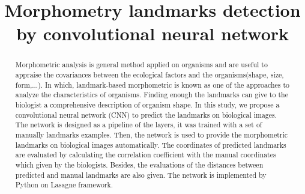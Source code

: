 \documentclass[conference]{IEEEtran}
\begin{document}
\title{Morphometry landmarks detection by convolutional neural network}

\author{
\and
{}
\and
{}
\and
{}

}

\maketitle

\begin{abstract}
Morphometric analysis is general method applied on organisms and are useful to appraise the covariances between the ecological factors and the organisms(shape, size, form,...). In which, landmark-based morphometric is known as one of the approaches to analyze the characteristics of organisms. Finding enough the landmarks can give to the biologist a comprehensive description of organism shape. In this study, we propose a convolutional neural network (CNN) to predict the landmarks on biological images. The network is designed as a pipeline of the layers, it was trained with a set of manually landmarks examples. Then, the network is used to provide the morphometric landmarks on biological images automatically. The coordinates of predicted landmarks are evaluated by calculating the correlation coefficient with the manual coordinates which given by the biologists. Besides, the evaluations of the distances between predicted and manual landmarks are also given. The network is implemented by Python on Lasagne framework.
\end{abstract}
\end{document}
